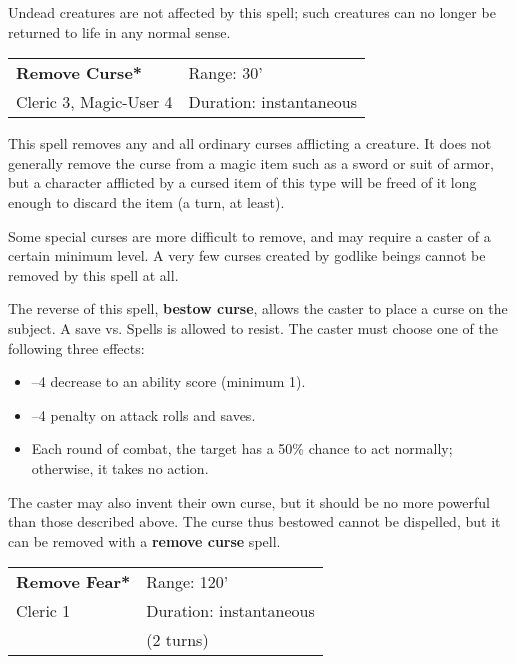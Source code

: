 \documentclass[a4paper,twoside,openany,10pt]{book}
\begin{document}
\begin{multicols}{2}
Undead creatures are not affected by this spell; such creatures can no longer be returned to life in any normal sense.

\smallskip\begin{flushleft} 
	\begin{tabularx}{0.45\textwidth}{@{}m{3.4cm}m{5.5cm}@{}} 
		\textbf{Remove Curse*} & Range: 30'\\
Cleric 3, Magic-User 4 &Duration: instantaneous\\
	\end{tabularx}\end{flushleft}

This spell removes any and all ordinary curses afflicting a creature. It does not generally remove the curse from a magic item such as a sword or suit of armor, but a character afflicted by a cursed item of this type will be freed of it long enough to discard the item (a turn, at least). 

Some special curses are more difficult to remove, and may require a caster of a certain minimum level. A very few curses created by godlike beings cannot be removed by this spell at all.

The reverse of this spell, \textbf{bestow curse}, allows the caster to place a curse on the subject. A save vs. Spells is allowed to resist. The caster must choose one of the following three effects:

\begin{itemize}
\item
  --4 decrease to an ability score (minimum 1).
\item
  --4 penalty on attack rolls and saves.
\item
Each round of combat, the target has a 50\% chance to act normally; otherwise, it takes no action.
\end{itemize}

The caster may also invent their own curse, but it should be no more powerful than those described above. The curse thus bestowed cannot be dispelled, but it can be removed with a \textbf{remove curse} spell.

\smallskip\begin{flushleft} 
	\begin{tabularx}{0.45\textwidth}{@{}m{3.5cm}m{5.5cm}@{}} 
		\textbf{Remove Fear*} & Range: 120'\\
Cleric 1 & Duration: instantaneous\\
& (2 turns) \\
	\end{tabularx}\end{flushleft}


\end{multicols}
\end{document}
